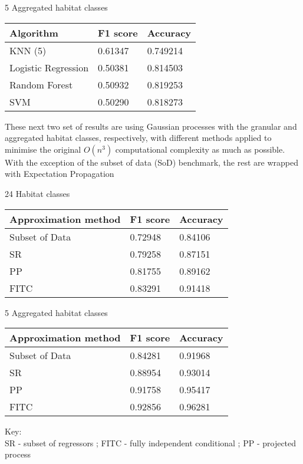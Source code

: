 \documentclass[journal]{IEEEtran}
\begin{document}
5 Aggregated habitat classes

\begin{tabular}{| l | l | l |}
    \hline
    Algorithm           & F1 score & Accuracy \\\hline
    KNN (5)             & 0.61347 & 0.749214 \\
    Logistic Regression & 0.50381 & 0.814503 \\
    Random Forest       & 0.50932 & 0.819253 \\
    SVM                 & 0.50290 & 0.818273 \\\hline
\end{tabular}

These next two set of results are using Gaussian processes with the granular and aggregated habitat classes, respectively, with different methods applied to minimise the original $O(n^3)$ computational complexity as much as possible. With the exception of the subset of data (SoD) benchmark, the rest are wrapped with Expectation Propagation

24 Habitat classes 

\begin{tabular}{| l | l | l |}
    \hline
    Approximation method    & F1 score & Accuracy \\\hline
    Subset of Data          & 0.72948 & 0.84106 \\
    SR                      & 0.79258 & 0.87151 \\
    PP                      & 0.81755 & 0.89162 \\
    FITC                     & 0.83291 & 0.91418 \\
    \hline
\end{tabular}

5 Aggregated habitat classes

\begin{tabular}{|l | l | l|}
    \hline
    Approximation method    & F1 score & Accuracy \\\hline
    Subset of Data          & 0.84281 & 0.91968 \\
    SR                      & 0.88954 & 0.93014 \\
    PP                      & 0.91758 & 0.95417 \\
    FITC                     & 0.92856 & 0.96281 \\
    \hline
\end{tabular}

Key:\\
SR - subset of regressors ; FITC - fully independent conditional ; PP - projected process
\end{document}
